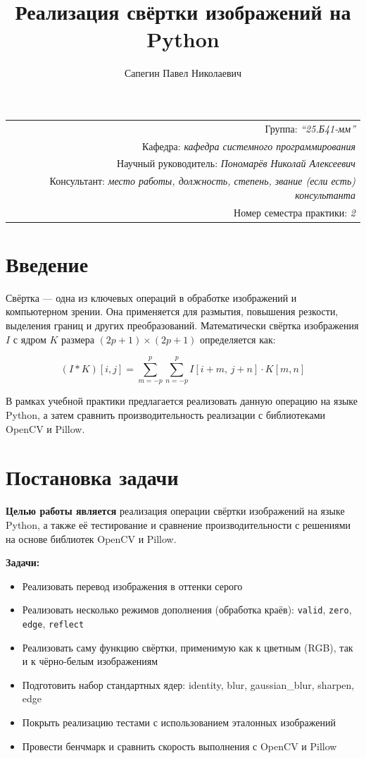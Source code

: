 \documentclass[a4paper]{article}
\title{Реализация свёртки изображений на Python}
\author{Сапегин Павел Николаевич}
\date{}
\begin{document}
\maketitle
\begin{flushright}
\begin{tabular}{r}
    Группа: \emph{\enquote{25.Б41-мм}} \\
    Кафедра: \emph{кафедра системного программирования} \\
    Научный руководитель: \emph{Пономарёв Николай Алексеевич} \\
    Консультант: \emph{место работы, должность, степень, звание (если есть) консультанта} \\

    Номер семестра практики: \emph{2} \\
\end{tabular}
\end{flushright}

\section{Введение}

Свёртка --- одна из ключевых операций в обработке изображений и компьютерном зрении. Она применяется для размытия, повышения резкости, выделения границ и других преобразований. Математически свёртка изображения $I$ с ядром $K$ размера $(2p+1) \times (2p+1)$ определяется как:

\[
(I * K)[i, j] = \sum_{m=-p}^{p} \sum_{n=-p}^{p} I[i+m,\, j+n] \cdot K[m, n]
\]

В рамках учебной практики предлагается реализовать данную операцию на языке Python, а затем сравнить производительность реализации с библиотеками OpenCV и Pillow.

\section{Постановка задачи}

\textbf{Целью работы является} реализация операции свёртки изображений на языке Python, а также её тестирование и сравнение производительности с решениями на основе библиотек OpenCV и Pillow.

\textbf{Задачи:}
\begin{itemize}[leftmargin=3.5em, topsep=0pt]
    \item Реализовать перевод изображения в оттенки серого
    \item Реализовать несколько режимов дополнения (обработка краёв): \verb|valid|, \verb|zero|, \verb|edge|, \verb|reflect|
    \item Реализовать саму функцию свёртки, применимую как к цветным (RGB), так и к чёрно-белым изображениям
    \item Подготовить набор стандартных ядер: identity, blur, gaussian\_blur, sharpen, edge
    \item Покрыть реализацию тестами с использованием эталонных изображений
    \item Провести бенчмарк и сравнить скорость выполнения с OpenCV и Pillow
\end{itemize}
\end{document}

